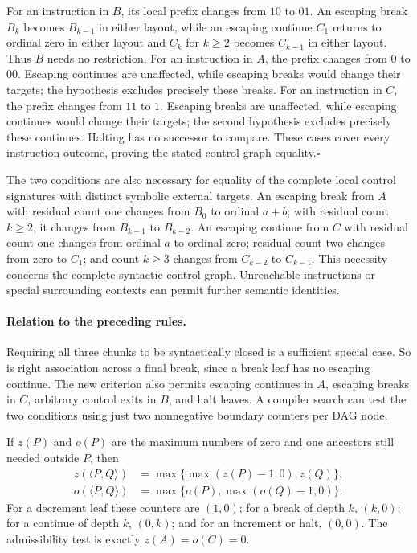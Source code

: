 For an instruction in $B$, its local prefix changes from $10$ to $01$.
An escaping break $B_k$ becomes $B_{k-1}$ in either layout, while an
escaping continue $C_1$ returns to ordinal zero in either layout and
$C_k$ for $k\geq2$ becomes $C_{k-1}$ in either layout.  Thus $B$ needs
no restriction.  For an instruction in $A$, the prefix changes from $0$
to $00$.  Escaping continues are unaffected, while escaping breaks would
change their targets; the hypothesis excludes precisely these breaks.
For an instruction in $C$, the prefix changes from $11$ to $1$.
Escaping breaks are unaffected, while escaping continues would change
their targets; the second hypothesis excludes precisely these continues.
Halting has no successor to compare.  These cases cover every instruction
outcome, proving the stated control-graph equality.\hfill$\square$

The two conditions are also necessary for equality of the complete local
control signatures with distinct symbolic external targets.  An escaping
break from $A$ with residual count one changes from $B_0$ to ordinal
$a+b$; with residual count $k\geq2$, it changes from $B_{k-1}$ to
$B_{k-2}$.  An escaping continue from $C$ with residual count one
changes from ordinal $a$ to ordinal zero; residual count two changes
from zero to $C_1$; and count $k\geq3$ changes from $C_{k-2}$ to
$C_{k-1}$.  This necessity concerns the complete syntactic control graph.
Unreachable instructions or special surrounding contexts can permit
further semantic identities.

\paragraph{Relation to the preceding rules.}
Requiring all three chunks to be syntactically closed is a sufficient
special case.  So is right association across a final break, since a
break leaf has no escaping continue.  The new criterion also permits
escaping continues in $A$, escaping breaks in $C$, arbitrary control exits
in $B$, and halt leaves.  A compiler search can test the two conditions
using just two nonnegative boundary counters per DAG node.

If $z(P)$ and $o(P)$ are the maximum numbers of zero and one ancestors
still needed outside $P$, then
\[
\begin{split}
z(\langle P,Q\rangle)&=\max\{\max(z(P)-1,0),z(Q)\},\\
o(\langle P,Q\rangle)&=\max\{o(P),\max(o(Q)-1,0)\}.
\end{split}
\]
For a decrement leaf these counters are $(1,0)$; for a break of depth
$k$, $(k,0)$; for a continue of depth $k$, $(0,k)$; and for an increment
or halt, $(0,0)$.  The admissibility test is exactly $z(A)=o(C)=0$.

